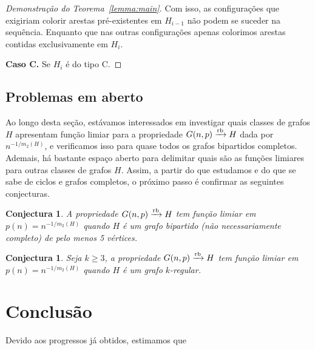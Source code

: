 \documentclass[12pt,a4paper]{book}
\newcommand{\K}{K_{\ell,r}} %
\def\rbarrow{\xrightarrow[]{\raisebox{0.0mm}[0mm]{$\scriptstyle \rm rb$}}}
\newtheorem{conjectura}[teorema] {Conjectura}
\begin{document}
\begin{proof}[Demonstração do Teorema~\ref{lemma:main}]
 
        Com isso, as configurações que exigiriam colorir arestas pré-existentes em $H_{i-1}$ não podem se suceder na sequência.
        Enquanto que nas outras configurações apenas colorimos arestas contidas exclusivamente em $H_{i}$.

        \medskip \textbf{Caso C.} Se $H_i$ é do tipo C.
     \end{proof}
 
  
  
\section{Problemas em aberto}
\label{subsec:bipartido-prob}
Ao longo desta seção, estávamos interessados em investigar quais classes de grafos $H$ apresentam função limiar para a propriedade $G(n,p)\rbarrow H$  dada por $n^{-1/m_2(H)}$, 
e verificamos isso para quase todos os grafos bipartidos completos.
Ademais, há bastante espaço aberto para delimitar quais são as funções limiares para outras classes de grafos $H$. 
Assim, a partir do que estudamos e do que se sabe de ciclos e grafos completos, o próximo passo é confirmar as seguintes conjecturas. %



\begin{conjectura}\label{conj:antibipartidos}
     A propriedade $G(n,p)\rbarrow H$ tem função limiar em  $p(n) =  n^{-1/m_2(H)}$ quando $H$ é um grafo bipartido (não necessariamente completo) de pelo menos 5 vértices.
\end{conjectura}

\begin{conjectura}\label{conj:antiregulares}
     Seja $k \geq 3$, a propriedade $G(n,p)\rbarrow H$ tem função limiar em  $p(n) =  n^{-1/m_2(H)}$ quando $H$ é um grafo $k$-regular.
\end{conjectura}

\chapter{Conclusão}
\label{sec:conclusao}

Devido aos progressos já obtidos, estimamos que 
\end{document}
